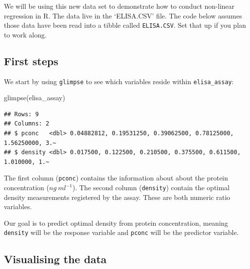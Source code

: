 \documentclass[
]{book}
\newenvironment{Shaded}{\begin{snugshade}}{\end{snugshade}}
\newcommand{\FunctionTok}[1]{\textcolor[rgb]{0.00,0.00,0.00}{#1}}
\newcommand{\NormalTok}[1]{#1}
\newenvironment{greybox}{
  \definecolor{shadecolor}{rgb}{0.95,0.95,0.95}  %
  \color{black}
  \begin{shaded}}
 {\end{shaded}}
\newenvironment{infobox}[1]
  {
  \begin{itemize}
  \renewcommand{\labelitemi}{
    \raisebox{-.7\height}[0pt][0pt]{
      {\setkeys{Gin}{width=3em,keepaspectratio}
        \texttt{[image: images/\#1]}}
    }
  }
  \setlength{\fboxsep}{1em}
  \begin{greybox}
  \item
  }
  {
  \end{greybox}
  \end{itemize}
  }
\begin{document}
\begin{infobox}{action}

\hypertarget{section-16}{%
\subsubsection*{}\label{section-16}}

We will be using this new data set to demonstrate how to conduct non-linear regression in R. The data live in the `ELISA.CSV' file. The code below assumes those data have been read into a tibble called \texttt{ELISA.CSV}. Set that up if you plan to work along.

\end{infobox}

\hypertarget{first-steps-2}{%
\subsection{First steps}\label{first-steps-2}}

We start by using \texttt{glimpse} to see which variables reside within \texttt{elisa\_assay}:

\begin{Shaded}
\begin{Highlighting}[]
\FunctionTok{glimpse}\NormalTok{(elisa\_assay)}
\end{Highlighting}
\end{Shaded}

\begin{verbatim}
## Rows: 9
## Columns: 2
## $ pconc   <dbl> 0.04882812, 0.19531250, 0.39062500, 0.78125000, 1.56250000, 3.~
## $ density <dbl> 0.017500, 0.122500, 0.210500, 0.375500, 0.611500, 1.010000, 1.~
\end{verbatim}

The first column (\texttt{pconc}) contains the information about about the protein concentration (\(ng\ ml^{-1}\)). The second column (\texttt{density}) contain the optimal density measurements registered by the assay. These are both numeric ratio variables.

Our goal is to predict optimal density from protein concentration, meaning \texttt{density} will be the response variable and \texttt{pconc} will be the predictor variable.

\hypertarget{visualising-the-data-2}{%
\subsection{Visualising the data}\label{visualising-the-data-2}}
\end{document}
